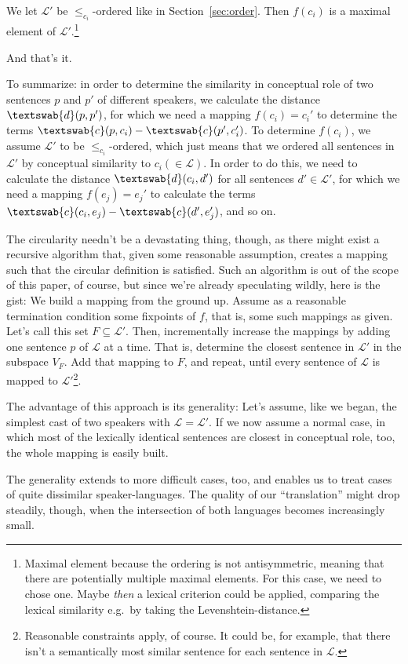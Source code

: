 \documentclass[11pt, a4paper]{scrartcl}
\renewcommand{\i}[1]{\emph{#1}}
\renewcommand{\L}{\mathcal{L}}
\newcommand{\m}[1]{\textswab{#1}}
\begin{document}
We let $\L'$ be $\leqslant_{c_i}$-ordered like in Section~\ref{sec:order}. Then $f(c_i)$ is a maximal element of $\L'$.\footnote{Maximal element because the ordering is not antisymmetric, meaning that there are potentially multiple maximal elements. For this case, we need to chose one. Maybe \i{then} a lexical criterion could be applied, comparing the lexical similarity e.g.\ by taking the Levenshtein-distance.} 

And that's it. 

To summarize: in order to determine the similarity in conceptual role of two sentences $p$ and $p'$ of different speakers, we calculate the distance $\m{d}(p,p')$, for which we need a mapping $f(c_i) = c_i'$ to determine the terms $\m{c}(p,c_i) - \m{c}(p',c_i')$. To determine $f(c_i)$, we assume $\L'$ to be $\leqslant_{c_i}$-ordered, which just means that we ordered all sentences in $\L'$ by conceptual similarity to $c_i (\in \L)$. In order to do this, we need to calculate the distance $\m{d}(c_i,d')$ for all sentences $d' \in \L'$, for which we need a mapping $f(e_j) = e_j'$ to calculate the terms $\m{c}(c_i,e_j) - \m{c}(d',e_j')$, and so on.

The circularity needn't be a devastating thing, though, as there might exist a recursive algorithm that, given some reasonable assumption, creates a mapping such that the circular definition is satisfied. Such an algorithm is out of the scope of this paper, of course, but since we're already speculating wildly, here is the gist: We build a mapping from the ground up. Assume as a reasonable termination condition some fixpoints of $f$, that is, some such mappings as given. Let's call this set $F \subseteq \L'$. Then, incrementally increase the mappings by adding one sentence $p$ of $\L$ at a time. That is, determine the closest sentence in $\L'$ in the subspace $V_F$. Add that mapping to $F$, and repeat, until every sentence of $\L$ is mapped to $\L'$\footnote{Reasonable constraints apply, of course. It could be, for example, that there isn't a semantically most similar sentence for each sentence in $\L$.}.   

The advantage of this approach is its generality: Let's assume, like we began, the simplest cast of two speakers with $\L = \L'$. If we now assume a normal case, in which most of the lexically identical sentences are closest in conceptual role, too, the whole mapping is easily built. 

The generality extends to more difficult cases, too, and enables us to treat cases of quite dissimilar speaker-languages. The quality of our ``translation'' might drop steadily, though, when the intersection of both languages becomes increasingly small. 
\end{document}
